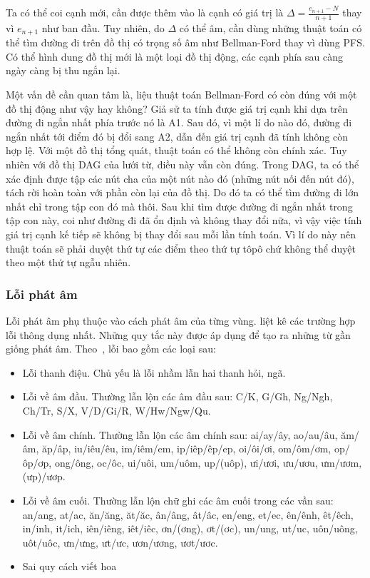 \documentclass[a4paper,oneside,14pt]{extbook} %
\begin{document}
Ta có thể coi cạnh mới, cần được thêm vào là cạnh có giá trị là
$\Delta=\frac{e_{n+1}-N}{n+1}$ thay vì $e_{n+1}$ như ban đầu. Tuy
nhiên, do $\Delta$ có thể âm, cần dùng những thuật toán có thể tìm
đường đi trên đồ thị có trọng số âm như Bellman-Ford thay vì dùng
PFS. Có thể hình dung đồ thị mới là một loại đồ thị động, các cạnh
phía sau càng ngày càng bị thu ngắn lại.

Một vấn đề cần quan tâm là, liệu thuật toán Bellman-Ford có còn đúng
với một đồ thị động như vậy hay không? Giả sử ta tính được giá trị
cạnh khi dựa trên đường đi ngắn nhất phía trước nó là A1. Sau đó, vì
một lí do nào đó, đường đi ngắn nhất tới điểm đó bị đổi sang A2, dẫn
đến giá trị cạnh đã tính không còn hợp lệ. Với một đồ thị tổng quát, thuật
toán có thể không còn chính xác. Tuy nhiên với đồ thị DAG của lưới từ,
điều này vẫn còn đúng. Trong DAG, ta có thể xác định được tập các nút
cha của một nút nào đó (những nút nối đến nút đó), tách rời hoàn toàn
với phần còn lại của đồ thị. Do đó ta có thể tìm đường đi lớn nhất chỉ
trong tập con đó mà thôi. Sau khi tìm được đường đi ngắn nhất trong
tập con này, coi như đường đi đã ổn định và không thay đổi nữa, vì vậy
việc tính giá trị cạnh kế tiếp sẽ không bị thay đổi sau mỗi lần tính
toán. Vì lí do này nên thuật toán sẽ phải duyệt thứ tự các điểm theo
thứ tự tôpô chứ không thể duyệt theo một thứ tự ngẫu nhiên.


\subsubsection{Lỗi phát âm}
\label{sec:realword:recover:sound}

Lỗi phát âm phụ thuộc vào cách phát âm của từng
vùng. \cite{LoiChinhTa} liệt kê các trường hợp lỗi thông dụng
nhất. Những quy tắc này được áp dụng để tạo ra những từ gần giống phát
âm.
Theo~\cite{LoiChinhTa}, lỗi bao gồm các loại sau:
\begin{itemize}
\item Lỗi thanh điệu. Chủ yếu là lỗi nhầm lẫn hai thanh hỏi, ngã.
\item Lỗi về âm đầu. Thường lẫn lộn các âm đầu sau: C/K, G/Gh, Ng/Ngh,
  Ch/Tr, S/X, V/D/Gi/R, W/Hw/Ngw/Qu.
\item Lỗi về âm chính. Thường lẫn lộn các âm chính sau: ai/ay/ây,
  ao/au/âu, ăm/âm, ăp/âp, iu/iêu/êu, im/iêm/em, ip/iêp/êp/ep,
  oi/ôi/ơi, om/ôm/ơm, op/ôp/ơp, ong/ông, oc/ôc, ui/uôi, um/uôm, up/(uôp),
  ưi/ươi, ưu/ươu, ưm/ươm, (ưp)/ươp.
\item Lỗi về âm cuối. Thường lẫn lộn chữ ghi các âm cuối trong các vần
  sau:
  an/ang, at/ac, ăn/ăng, ăt/ăc, ân/âng, ât/âc, en/eng, et/ec, ên/ênh,
  êt/êch, in/inh, it/ich, iên/iêng, iêt/iêc, ơn/(ơng), ơt/(ơc),
  un/ung, ut/uc, uôn/uông, uôt/uôc, ưn/ưng, ưt/ưc, ươn/ương, ươt/ươc.
\item Sai quy cách viết hoa
\end{itemize}
\end{document}
